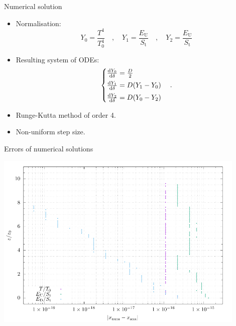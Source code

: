 \documentclass[aspectratio=43]{beamer}
\begin{document}
\begin{frame}{Numerical solution}
  \begin{itemize}
    \item Normalisation:
      \begin{equation}
        \label{eq:normalisation}
        Y_0 = \frac{T^4}{T_0^4}
        \quad , \quad
        Y_1 = \frac{E_\text{U}}{S_\text{t}}
        \quad , \quad
        Y_2 = \frac{E_\text{U}}{S_\text{t}}
      \end{equation}
    \item Resulting system of ODEs:
      \begin{equation}
        \label{eq:numerical_steady_state}
        \left\{
        \begin{array}{@{}l@{}}
          \odv{Y_0}{\delta} = \frac{D}{2} \\[0.5em]
          \odv{Y_1}{\delta} = D (Y_1 - Y_0) \\[0.5em]
          \odv{Y_2}{\delta} = D (Y_0 - Y_2)
        \end{array}
        \right.
        \quad .
      \end{equation}
    \item Runge-Kutta method of order 4.
    \item Non-uniform step size.
  \end{itemize}
\end{frame}

\begin{frame}{Errors of numerical solutions}
  \begin{center}
    \includegraphics[keepaspectratio=true,width=0.9\textwidth]{errors}
  \end{center}
\end{frame}
\end{document}

